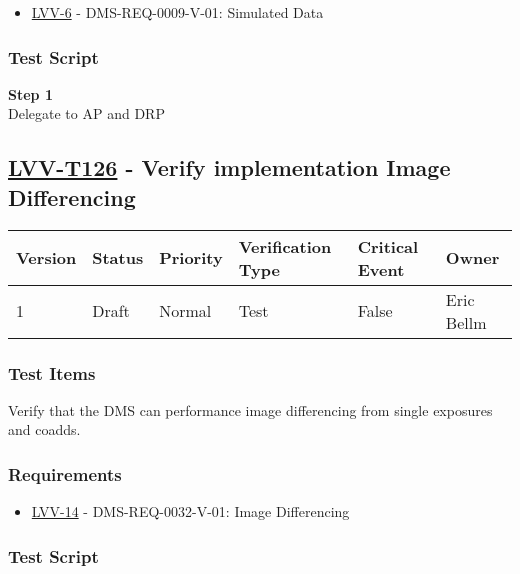 \begin{itemize}
\tightlist
\item
  \href{https://jira.lsstcorp.org/browse/LVV-6}{LVV-6} -
  DMS-REQ-0009-V-01: Simulated Data
\end{itemize}

\subsubsection{Test Script}\label{test-script-3}

\textbf{Step 1}\\
Delegate to AP and DRP\\[2\baselineskip]

\subsection{\texorpdfstring{\href{https://jira.lsstcorp.org/secure/Tests.jspa\#/testCase/LVV-T126}{LVV-T126}
- Verify implementation Image
Differencing}{LVV-T126 - Verify implementation Image Differencing}}\label{lvv-t126---verify-implementation-image-differencing}

\begin{longtable}[]{@{}llllll@{}}
\toprule
Version & Status & Priority & Verification Type & Critical Event &
Owner\tabularnewline
\midrule
\endhead
1 & Draft & Normal & Test & False & Eric Bellm\tabularnewline
\bottomrule
\end{longtable}

\subsubsection{Test Items}\label{test-items-4}

Verify that the DMS can performance image differencing from single
exposures and coadds.

\subsubsection{Requirements}\label{requirements-4}

\begin{itemize}
\tightlist
\item
  \href{https://jira.lsstcorp.org/browse/LVV-14}{LVV-14} -
  DMS-REQ-0032-V-01: Image Differencing
\end{itemize}

\subsubsection{Test Script}\label{test-script-4}


